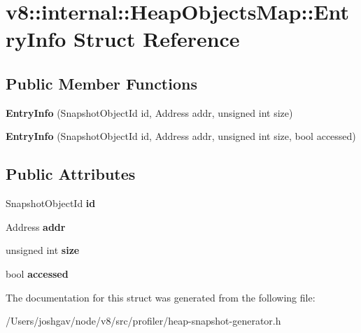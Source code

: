 \hypertarget{structv8_1_1internal_1_1_heap_objects_map_1_1_entry_info}{}\section{v8\+:\+:internal\+:\+:Heap\+Objects\+Map\+:\+:Entry\+Info Struct Reference}
\label{structv8_1_1internal_1_1_heap_objects_map_1_1_entry_info}
\subsection*{Public Member Functions}
\begin{DoxyCompactItemize}
\item 
{\bfseries Entry\+Info} (Snapshot\+Object\+Id id, Address addr, unsigned int size)\hypertarget{structv8_1_1internal_1_1_heap_objects_map_1_1_entry_info_ae19d94d48f2e683be2a624cb40815472}{}\label{structv8_1_1internal_1_1_heap_objects_map_1_1_entry_info_ae19d94d48f2e683be2a624cb40815472}

\item 
{\bfseries Entry\+Info} (Snapshot\+Object\+Id id, Address addr, unsigned int size, bool accessed)\hypertarget{structv8_1_1internal_1_1_heap_objects_map_1_1_entry_info_a79e2e46f7b7da2819500a929cac0752e}{}\label{structv8_1_1internal_1_1_heap_objects_map_1_1_entry_info_a79e2e46f7b7da2819500a929cac0752e}

\end{DoxyCompactItemize}
\subsection*{Public Attributes}
\begin{DoxyCompactItemize}
\item 
Snapshot\+Object\+Id {\bfseries id}\hypertarget{structv8_1_1internal_1_1_heap_objects_map_1_1_entry_info_ad7ca58fbbb790773549f010bd28f4e6f}{}\label{structv8_1_1internal_1_1_heap_objects_map_1_1_entry_info_ad7ca58fbbb790773549f010bd28f4e6f}

\item 
Address {\bfseries addr}\hypertarget{structv8_1_1internal_1_1_heap_objects_map_1_1_entry_info_abe150f8447fda2c2d8644fbcf5bb5428}{}\label{structv8_1_1internal_1_1_heap_objects_map_1_1_entry_info_abe150f8447fda2c2d8644fbcf5bb5428}

\item 
unsigned int {\bfseries size}\hypertarget{structv8_1_1internal_1_1_heap_objects_map_1_1_entry_info_a3ad63582dc08e330e56a2f91cf022d99}{}\label{structv8_1_1internal_1_1_heap_objects_map_1_1_entry_info_a3ad63582dc08e330e56a2f91cf022d99}

\item 
bool {\bfseries accessed}\hypertarget{structv8_1_1internal_1_1_heap_objects_map_1_1_entry_info_acff2625b1d0a253d62933ab95ff185fb}{}\label{structv8_1_1internal_1_1_heap_objects_map_1_1_entry_info_acff2625b1d0a253d62933ab95ff185fb}

\end{DoxyCompactItemize}


The documentation for this struct was generated from the following file\+:\begin{DoxyCompactItemize}
\item 
/\+Users/joshgav/node/v8/src/profiler/heap-\/snapshot-\/generator.\+h\end{DoxyCompactItemize}
